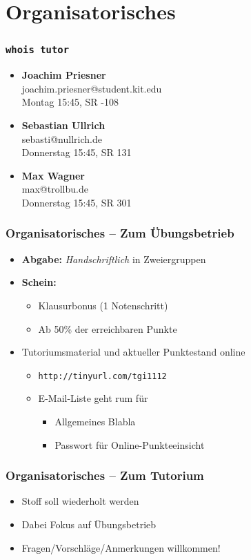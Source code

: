 

\section{Organisatorisches}

\begin{frame}
	\frametitle{\texttt{whois tutor}}
	
	\begin{itemize}
		\item \textbf{Joachim Priesner} \\ joachim.priesner@student.kit.edu \\ Montag 15:45, SR -108
		\item \textbf{Sebastian Ullrich} \\ sebasti@nullrich.de \\ Donnerstag 15:45, SR 131
		\item \textbf{Max Wagner} \\ max@trollbu.de \\ Donnerstag 15:45, SR 301
	\end{itemize}
\end{frame}

\begin{frame}
	\frametitle{Organisatorisches -- Zum Übungsbetrieb}
	\begin{itemize}
		\item \textbf{Abgabe:} \emph{Handschriftlich} in Zweiergruppen
		\item \textbf{Schein:} 
		\begin{itemize}
			\item Klausurbonus (1 Notenschritt)
			\item Ab 50\% der erreichbaren Punkte
		\end{itemize}
		\item Tutoriumsmaterial und aktueller Punktestand online
		\begin{itemize}
			\item \texttt{http://tinyurl.com/tgi1112}
			\item E-Mail-Liste geht rum für
			\begin{itemize}
				\item Allgemeines Blabla
				\item Passwort für Online-Punkteeinsicht
			\end{itemize}
		\end{itemize}
	\end{itemize}
\end{frame}
\begin{frame}
	\frametitle{Organisatorisches -- Zum Tutorium}
	\begin{itemize}
		\item Stoff soll wiederholt werden
		\item Dabei Fokus auf Übungsbetrieb
		\item Fragen/Vorschläge/Anmerkungen willkommen!
	\end{itemize}
\end{frame}
